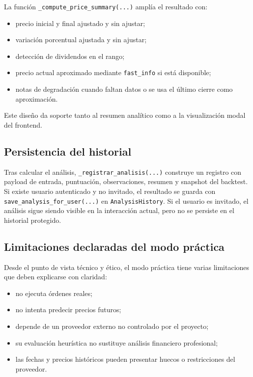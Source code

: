 La función \texttt{\_compute\_price\_summary(...)} amplía el resultado con:

\begin{itemize}
    \item precio inicial y final ajustado y sin ajustar;
    \item variación porcentual ajustada y sin ajustar;
    \item detección de dividendos en el rango;
    \item precio actual aproximado mediante \texttt{fast\_info} si está disponible;
    \item notas de degradación cuando faltan datos o se usa el último cierre como aproximación.
\end{itemize}

Este diseño da soporte tanto al resumen analítico como a la visualización modal del frontend.

\subsection{Persistencia del historial}

Tras calcular el análisis, \texttt{\_registrar\_analisis(...)} construye un registro con payload de entrada, puntuación, observaciones, resumen y snapshot del backtest. Si existe usuario autenticado y no invitado, el resultado se guarda con \texttt{save\_analysis\_for\_user(...)} en \texttt{AnalysisHistory}. Si el usuario es invitado, el análisis sigue siendo visible en la interacción actual, pero no se persiste en el historial protegido.

\subsection{Limitaciones declaradas del modo práctica}

Desde el punto de vista técnico y ético, el modo práctica tiene varias limitaciones que deben explicarse con claridad:

\begin{itemize}
    \item no ejecuta órdenes reales;
    \item no intenta predecir precios futuros;
    \item depende de un proveedor externo no controlado por el proyecto;
    \item su evaluación heurística no sustituye análisis financiero profesional;
    \item las fechas y precios históricos pueden presentar huecos o restricciones del proveedor.
\end{itemize}

